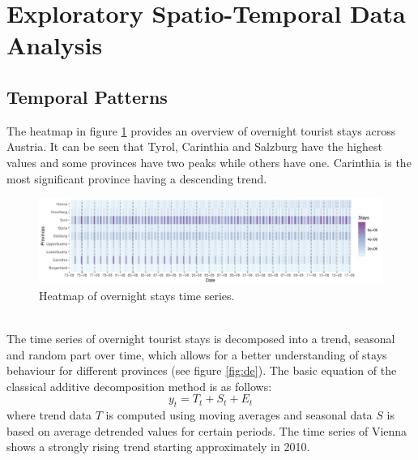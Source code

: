 \documentclass[a4paper,reqno,]{article}
\begin{document}
\section{Exploratory Spatio-Temporal Data Analysis}
\label{sec:expl_anal}
\subsection{Temporal Patterns}
\label{ssec:t_pat}
The heatmap in figure \ref{fig:heat} provides an overview of overnight tourist stays across Austria. It can be seen that Tyrol, Carinthia and Salzburg have the highest values and some provinces have two peaks while others have one. Carinthia is the most significant province having a descending trend.
\begin{figure}[h!]
\begin{minipage}[b]{1\textwidth}
\centering
    \includegraphics[width=1\textwidth]{images/EA/Heatmap.pdf}
    \caption{Heatmap of overnight stays time series.}\label{fig:heat}
\end{minipage}
\end{figure} 
\\
\noindent
The time series of overnight tourist stays is decomposed into a trend, seasonal and random part over time, which allows for a better understanding of stays behaviour for different provinces (see figure \ref{fig:de}). The basic equation of the classical additive decomposition method is as follows:
$$y_{t}=T_{t}+S_{t}+E_{t}$$
where trend data $T$ is computed using moving averages and seasonal data $S$ is based on average detrended values for certain periods. The time series of Vienna shows a strongly rising trend starting approximately in 2010.
\end{document}
